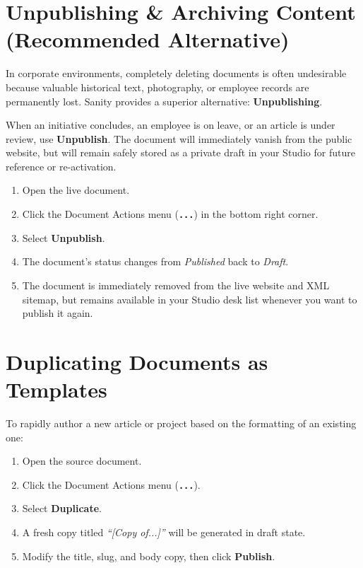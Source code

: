 \documentclass[11pt,a4paper,oneside]{book}
\begin{document}
\section{Unpublishing \& Archiving Content (Recommended Alternative)}
In corporate environments, completely deleting documents is often undesirable because valuable historical text, photography, or employee records are permanently lost. Sanity provides a superior alternative: \textbf{Unpublishing}.

\begin{tipbox}
When an initiative concludes, an employee is on leave, or an article is under review, use \textbf{Unpublish}. The document will immediately vanish from the public website, but will remain safely stored as a private draft in your Studio for future reference or re-activation.
\end{tipbox}

\begin{enumerate}[leftmargin=*,label=\textbf{Step \arabic*:}]
  \item Open the live document.
  \item Click the Document Actions menu (\textbf{\texttt{...}}) in the bottom right corner.
  \item Select \textbf{Unpublish}.
  \item The document's status changes from \textit{Published} back to \textit{Draft}.
  \item The document is immediately removed from the live website and XML sitemap, but remains available in your Studio desk list whenever you want to publish it again.
\end{enumerate}

\section{Duplicating Documents as Templates}
To rapidly author a new article or project based on the formatting of an existing one:
\begin{enumerate}
  \item Open the source document.
  \item Click the Document Actions menu (\textbf{\texttt{...}}).
  \item Select \textbf{Duplicate}.
  \item A fresh copy titled \textit{``[Copy of...]''} will be generated in draft state.
  \item Modify the title, slug, and body copy, then click \textbf{Publish}.
\end{enumerate}
\end{document}
